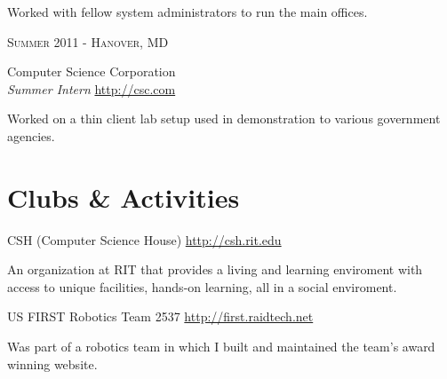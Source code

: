 \documentclass[10pt]{article} %
\begin{document}
{\begin{minipage}[t]{0.5\textwidth}
\normalsize{Worked with fellow system administrators to run the main offices.} \\


{\raggedleft\textsc{Summer 2011 - Hanover, MD}\par}

{\raggedright\large Computer Science Corporation \\
    \textit{Summer Intern } \hfill {\small \href{http://cscc.om}{http://csc.com}} \\[5pt]} 

\normalsize{ Worked on a thin client lab setup used in demonstration to various government agencies.} \\


\section{Clubs \& Activities}
CSH (Computer Science House) \hfill \href{http://csh.rit.edu/}{http://csh.rit.edu} \\
\begin{sloppypar}
An organization at RIT that provides a living and learning enviroment with access to unique facilities, hands-on learning, all in a social enviroment.\\
\end{sloppypar}
US FIRST Robotics Team 2537 \hfill \href{http://first.raidtech.net}{http://first.raidtech.net} \\
\begin{sloppypar}
Was part of a robotics team in which I built and maintained the team's award winning website. \\
\end{sloppypar}
\end{minipage} %
\hfill
\begin{minipage}[t]{0.44\textwidth} %
\vspace{0pt} %



\end{minipage}}
\end{document}
